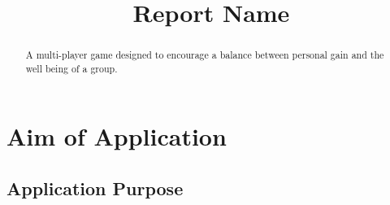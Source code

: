 \documentclass{sig-alt-release2}
\begin{document}
\newcommand{\todo}[1]{\textcolor{red}{#1}}


\title{{Report Name}}

\maketitle

\begin{abstract}
A multi-player game designed to encourage a balance between personal gain and the well being of a group.

\end{abstract}

\section{Aim of Application}

\subsection{Application Purpose}
\end{document}
